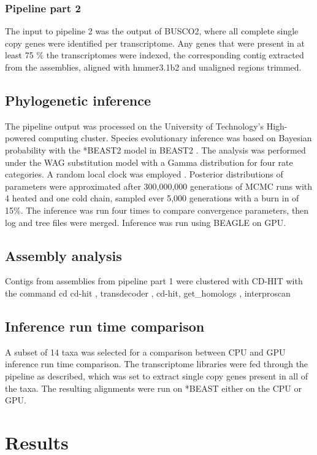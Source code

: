\documentclass[12pt]{article}
\begin{document}
\subsubsection*{Pipeline part 2}
The input to pipeline 2 was the output of BUSCO2, where all complete single copy genes were identified per transcriptome. 
Any genes that were present in at least 75 \% the transcriptomes were indexed, the corresponding contig extracted from the assemblies, aligned with hmmer3.1b2 \cite{eddy2015hmmer} and unaligned regions trimmed.
\subsection*{Phylogenetic inference}
The pipeline output was processed on the University of Technology's High-powered computing cluster.
Species evolutionary inference was based on Bayesian probability with the *BEAST2 model in BEAST2 \cite{bouckaert2014beast}. 
The analysis was performed under the WAG substitution model \cite{whelan2001general} with a Gamma distribution for four rate categories. 
A random local clock was employed \cite{drummond2010bayesian}. 
Posterior distributions of parameters were approximated after 300,000,000 generations of MCMC runs with 4 heated and one cold chain, sampled ever 5,000 generations  with a burn in of 15\%. 
The inference was run four times to compare convergence parameters, then log and tree files were merged. 
Inference was run using BEAGLE \cite{ayres2011beagle} on GPU.

\subsection*{Assembly analysis}
Contigs from assemblies from pipeline part 1 were clustered with CD-HIT with the command cd %
cd-hit \cite{fu2012cd}, transdecoder \cite{haas2016transdecoder}, cd-hit, get\_homologs \cite{contreras2013gethom}, interproscan \cite{quevillon2005interproscan}
\subsection*{Inference run time comparison}
A subset of 14 taxa was selected for a comparison between CPU and GPU inference run time comparison. 
The transcriptome libraries were fed through the pipeline as described, which was set to extract single copy genes present in all of the taxa. 
The resulting alignments were run on *BEAST either on the CPU or GPU.

\newpage
\section{Results}
\end{document}
